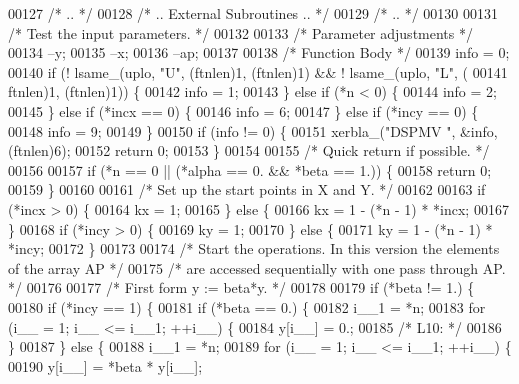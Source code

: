 \begin{DoxyCode}
00127 \textcolor{comment}{/*     .. */}
00128 \textcolor{comment}{/*     .. External Subroutines .. */}
00129 \textcolor{comment}{/*     .. */}
00130 
00131 \textcolor{comment}{/*     Test the input parameters. */}
00132 
00133     \textcolor{comment}{/* Parameter adjustments */}
00134     --y;
00135     --x;
00136     --ap;
00137 
00138     \textcolor{comment}{/* Function Body */}
00139     info = 0;
00140     \textcolor{keywordflow}{if} (! lsame\_(uplo, \textcolor{stringliteral}{"U"}, (ftnlen)1, (ftnlen)1) && ! lsame\_(uplo, \textcolor{stringliteral}{"L"}, (
00141         ftnlen)1, (ftnlen)1)) \{
00142     info = 1;
00143     \} \textcolor{keywordflow}{else} \textcolor{keywordflow}{if} (*n < 0) \{
00144     info = 2;
00145     \} \textcolor{keywordflow}{else} \textcolor{keywordflow}{if} (*incx == 0) \{
00146     info = 6;
00147     \} \textcolor{keywordflow}{else} \textcolor{keywordflow}{if} (*incy == 0) \{
00148     info = 9;
00149     \}
00150     \textcolor{keywordflow}{if} (info != 0) \{
00151     xerbla\_(\textcolor{stringliteral}{"DSPMV "}, &info, (ftnlen)6);
00152     \textcolor{keywordflow}{return} 0;
00153     \}
00154 
00155 \textcolor{comment}{/*     Quick return if possible. */}
00156 
00157     \textcolor{keywordflow}{if} (*n == 0 || (*alpha == 0. && *beta == 1.)) \{
00158     \textcolor{keywordflow}{return} 0;
00159     \}
00160 
00161 \textcolor{comment}{/*     Set up the start points in  X  and  Y. */}
00162 
00163     \textcolor{keywordflow}{if} (*incx > 0) \{
00164     kx = 1;
00165     \} \textcolor{keywordflow}{else} \{
00166     kx = 1 - (*n - 1) * *incx;
00167     \}
00168     \textcolor{keywordflow}{if} (*incy > 0) \{
00169     ky = 1;
00170     \} \textcolor{keywordflow}{else} \{
00171     ky = 1 - (*n - 1) * *incy;
00172     \}
00173 
00174 \textcolor{comment}{/*     Start the operations. In this version the elements of the array AP */}
00175 \textcolor{comment}{/*     are accessed sequentially with one pass through AP. */}
00176 
00177 \textcolor{comment}{/*     First form  y := beta*y. */}
00178 
00179     \textcolor{keywordflow}{if} (*beta != 1.) \{
00180     \textcolor{keywordflow}{if} (*incy == 1) \{
00181         \textcolor{keywordflow}{if} (*beta == 0.) \{
00182         i\_\_1 = *n;
00183         \textcolor{keywordflow}{for} (i\_\_ = 1; i\_\_ <= i\_\_1; ++i\_\_) \{
00184             y[i\_\_] = 0.;
00185 \textcolor{comment}{/* L10: */}
00186         \}
00187         \} \textcolor{keywordflow}{else} \{
00188         i\_\_1 = *n;
00189         \textcolor{keywordflow}{for} (i\_\_ = 1; i\_\_ <= i\_\_1; ++i\_\_) \{
00190             y[i\_\_] = *beta * y[i\_\_];

\end{DoxyCode}
